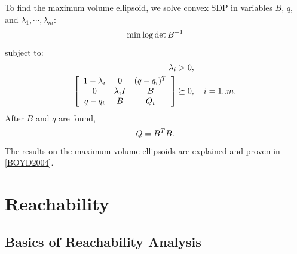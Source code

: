 \documentclass[letterpaper,10pt,english]{sphinxmanual}
\begin{document}
To find the maximum volume ellipsoid, we solve convex SDP in variables
\(B\), \(q\), and \(\lambda_1,\cdots,\lambda_m\):
\begin{gather}
\begin{split}\min \log \det B^{-1}\end{split}\notag
\end{gather}
subject to:
\begin{gather}
\begin{split}\begin{aligned}
\lambda_i & >  0, \\
\left[\begin{array}{ccc}
1-\lambda_i & 0 & (q - q_i)^T\\
0 & \lambda_iI & B\\
q - q_i & B & Q_i\end{array}\right] & \succeq  0, ~~~ i=1..m.\end{aligned}\end{split}\notag
\end{gather}
After \(B\) and \(q\) are found,
\begin{gather}
\begin{split}Q = B^TB.\end{split}\notag
\end{gather}
The results on the maximum volume ellipsoids are explained and proven in
{\hyperref[chap_ellcalc:boyd2004]{{[}BOYD2004{]}}}.


\chapter{Reachability}
\label{chap_reach:reachability}\label{chap_reach::doc}

\section{Basics of Reachability Analysis}
\label{chap_reach:basics-of-reachability-analysis}
\end{document}
